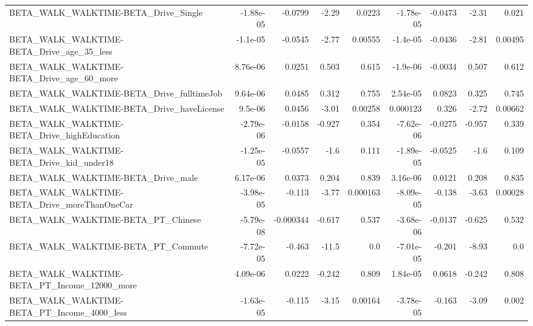 \begin{tabular}{lrrrrrrrr}
BETA\_WALK\_WALKTIME-BETA\_Drive\_Single               &   -1.88e-05 &      -0.0799 &     -2.29 &   0.0223 &  -1.78e-05 &     -0.0473 &        -2.31 &         0.021 \\
BETA\_WALK\_WALKTIME-BETA\_Drive\_age\_35\_less          &    -1.1e-05 &      -0.0545 &     -2.77 &  0.00555 &   -1.4e-05 &     -0.0436 &        -2.81 &       0.00495 \\
BETA\_WALK\_WALKTIME-BETA\_Drive\_age\_60\_more          &    8.76e-06 &       0.0251 &     0.503 &    0.615 &   -1.9e-06 &     -0.0034 &        0.507 &         0.612 \\
BETA\_WALK\_WALKTIME-BETA\_Drive\_fulltimeJob          &    9.64e-06 &       0.0485 &     0.312 &    0.755 &   2.54e-05 &      0.0823 &        0.325 &         0.745 \\
BETA\_WALK\_WALKTIME-BETA\_Drive\_haveLicense          &     9.5e-06 &       0.0456 &     -3.01 &  0.00258 &   0.000123 &       0.326 &        -2.72 &       0.00662 \\
BETA\_WALK\_WALKTIME-BETA\_Drive\_highEducation        &   -2.79e-06 &      -0.0158 &    -0.927 &    0.354 &  -7.62e-06 &     -0.0275 &       -0.957 &         0.339 \\
BETA\_WALK\_WALKTIME-BETA\_Drive\_kid\_under18          &   -1.25e-05 &      -0.0557 &      -1.6 &    0.111 &  -1.89e-05 &     -0.0525 &         -1.6 &         0.109 \\
BETA\_WALK\_WALKTIME-BETA\_Drive\_male                 &    6.17e-06 &       0.0373 &     0.204 &    0.839 &   3.16e-06 &      0.0121 &        0.208 &         0.835 \\
BETA\_WALK\_WALKTIME-BETA\_Drive\_moreThanOneCar       &   -3.98e-05 &       -0.113 &     -3.77 & 0.000163 &  -8.09e-05 &      -0.138 &        -3.63 &       0.00028 \\
BETA\_WALK\_WALKTIME-BETA\_PT\_Chinese                 &   -5.79e-08 &    -0.000344 &    -0.617 &    0.537 &  -3.68e-06 &     -0.0137 &       -0.625 &         0.532 \\
BETA\_WALK\_WALKTIME-BETA\_PT\_Commute                 &   -7.72e-05 &       -0.463 &     -11.5 &      0.0 &  -7.01e-05 &      -0.201 &        -8.93 &           0.0 \\
BETA\_WALK\_WALKTIME-BETA\_PT\_Income\_12000\_more       &    4.09e-06 &       0.0222 &    -0.242 &    0.809 &   1.84e-05 &      0.0618 &       -0.242 &         0.808 \\
BETA\_WALK\_WALKTIME-BETA\_PT\_Income\_4000\_less        &   -1.63e-05 &       -0.115 &     -3.15 &  0.00164 &  -3.78e-05 &      -0.163 &        -3.09 &         0.002 \\

\end{tabular}
